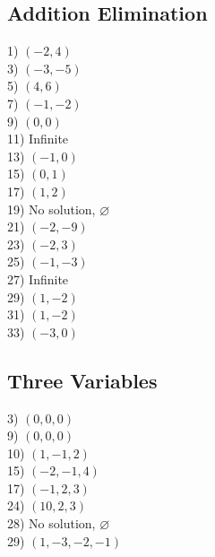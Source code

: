 \documentclass[12pt]{book}
\theoremstyle{definition}
\begin{document}
\subsection*{Addition Elimination}

\begin{multicols}{4}
1) $(-2,4)$\\
3) $(-3,-5)$\\
5) $(4,6)$\\
7) $(-1,-2)$\\
9) $(0,0)$\\
11) Infinite\\
13) $(-1,0)$\\
15) $(0,1)$\\
17) $(1,2)$\\
19) No solution, $\varnothing$\\
21) $(-2,-9)$\\
23) $(-2,3)$\\
25) $(-1,-3)$\\
27) Infinite\\
29) $(1,-2)$\\
31) $(1,-2)$\\
33) $(-3,0)$\\
\end{multicols}


\subsection*{Three Variables}

\begin{multicols}{4}
3) $(0,0,0)$\\
9) $(0,0,0)$\\
10) $(1,-1,2)$\\
15) $(-2,-1,4)$\\
17) $(-1,2,3)$\\
24) $(10,2,3)$\\
28) No solution, $\varnothing$\\
29) $(1,-3,-2,-1)$
\end{multicols}
\end{document}
